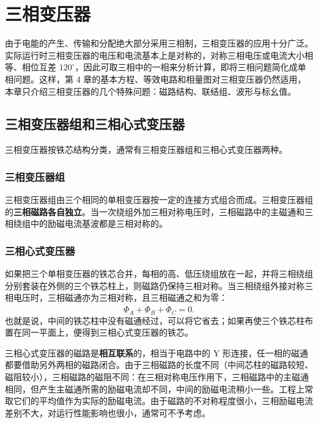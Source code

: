 \chapter{三相变压器}

由于电能的产生、传输和分配绝大部分采用三相制，三相变压器的应用十分广泛。实际运行时三相变压器的电压和电流基本上是对称的，对称三相电压或电流大小相等、相位互差 $120^\circ$，因此可取三相中的一相来分析计算，即将三相问题简化成单相问题。这样，第 4 章的基本方程、等效电路和相量图对三相变压器仍然适用，本章只介绍三相变压器的几个特殊问题：磁路结构、联结组、波形与标幺值。

\section{三相变压器组和三相心式变压器}

三相变压器按铁芯结构分类，通常有三相变压器组和三相心式变压器两种。

\subsection{三相变压器组}
三相变压器组由三个相同的单相变压器按一定的连接方式组合而成。三相变压器组的\textbf{三相磁路各自独立}。当一次绕组外加三相对称电压时，三相磁路中的主磁通和三相绕组中的励磁电流基波都是三相对称的。

\subsection{三相心式变压器}
如果把三个单相变压器的铁芯合并，每相的高、低压绕组放在一起，并将三相绕组分别套装在外侧的三个铁芯柱上，则磁路仍保持三相对称。当三相绕组外接对称三相电压时，三相磁通亦为三相对称，且三相磁通之和为零：
\begin{equation}
\dot\Phi_A+\dot\Phi_B+\dot\Phi_C=0 .
\end{equation}
也就是说，中间的铁芯柱中没有磁通经过，可以将它省去；如果再使三个铁芯柱布置在同一平面上，便得到三相心式变压器的铁芯。

三相心式变压器的磁路是\textbf{相互联系}的，相当于电路中的 Y 形连接，任一相的磁通都要借助另外两相的磁路闭合。由于三相磁路的长度不同（中间芯柱的磁路较短、磁阻较小），三相磁路的磁阻不同：在三相对称电压作用下，三相磁路中的主磁通相同，但产生主磁通所需的励磁电流却不同，中间的励磁电流稍小一些。工程上常取它们的平均值作为实际的励磁电流。由于磁路的不对称程度很小，三相励磁电流差别不大，对运行性能影响也很小，通常可不予考虑。

